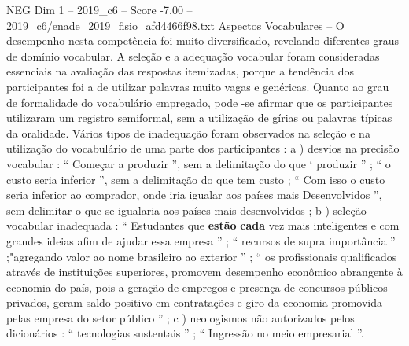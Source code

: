 \begin{textsample}{NEG Dim 1 – 2019\_c6 – Score -7.00 – 2019\_c6/enade\_2019\_fisio\_afd4466f98.txt}
Aspectos Vocabulares – O desempenho nesta competência foi muito diversificado, revelando diferentes graus de domínio vocabular.
A seleção e a adequação vocabular foram consideradas essenciais na avaliação das respostas itemizadas, porque a tendência dos participantes foi a de utilizar palavras muito vagas e genéricas.
Quanto ao grau de formalidade do vocabulário empregado, pode -se afirmar que os participantes utilizaram um registro semiformal, sem a utilização de gírias ou palavras típicas da oralidade.
Vários tipos de inadequação foram observados na seleção e na utilização do vocabulário de uma parte dos participantes : a ) desvios na precisão vocabular : “ Começar a produzir ”, sem a delimitação do que ‘ produzir ” ; “ o custo seria inferior ”, sem a delimitação do que tem custo ; “ Com isso o custo seria inferior ao comprador, onde iria igualar aos países mais Desenvolvidos ”, sem delimitar o que se igualaria aos países mais desenvolvidos ; b ) seleção vocabular inadequada : “ Estudantes que \textbf{estão} \textbf{cada} vez mais inteligentes e com grandes ideias afim de ajudar essa empresa ” ; “ recursos de supra importância ” ;"agregando valor ao nome brasileiro ao exterior ” ; “ os profissionais qualificados através de instituições superiores, promovem desempenho econômico abrangente à economia do país, pois a geração de empregos e presença de concursos públicos privados, geram saldo positivo em contratações e giro da economia promovida pelas empresa do setor público ” ; c ) neologismos não autorizados pelos dicionários : “ tecnologias sustentais ” ; “ Ingressão no meio empresarial ”.

\end{textsample}
